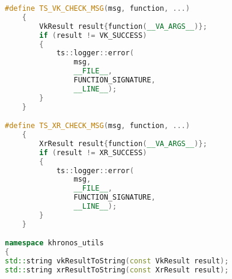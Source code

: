 \begin{itemize}
\begin{lstlisting}[language=c++, caption=Khronos Utils (./engine/src/khronos\_utils.h)]
#define TS_VK_CHECK_MSG(msg, function, ...)                                                                \
    {                                                                                                      \
        VkResult result{function(__VA_ARGS__)};                                                            \
        if (result != VK_SUCCESS)                                                                          \
        {                                                                                                  \
            ts::logger::error(                                                                             \
                msg,                                                                                       \
                __FILE__,                                                                                  \
                FUNCTION_SIGNATURE,                                                                        \
                __LINE__);                                                                                 \
        }                                                                                                  \
    }

#define TS_XR_CHECK_MSG(msg, function, ...)                                                                \
    {                                                                                                      \
        XrResult result{function(__VA_ARGS__)};                                                            \
        if (result != XR_SUCCESS)                                                                          \
        {                                                                                                  \
            ts::logger::error(                                                                             \
                msg,                                                                                       \
                __FILE__,                                                                                  \
                FUNCTION_SIGNATURE,                                                                        \
                __LINE__);                                                                                 \
        }                                                                                                  \
    }

namespace khronos_utils
{
std::string vkResultToString(const VkResult result);
std::string xrResultToString(const XrResult result);


\end{lstlisting}
\end{itemize}
